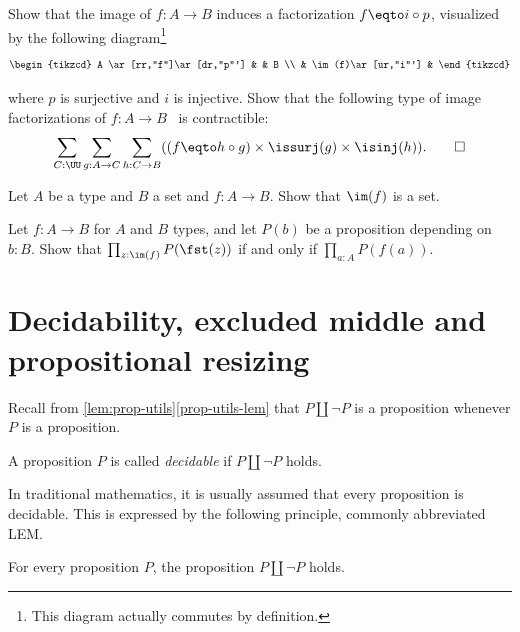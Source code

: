 \begin{xca}\label{xca:unique-fact-image}
  Show that the image of $f : A \to B$ induces a factorization
  $f \eqto i\circ p$, visualized by the following diagram\footnote{%
  This diagram actually commutes by definition.}
  \[
    \begin{tikzcd}
      A \ar[rr,"f"]\ar[dr,"p"'] & & B \\
      & \im(f)\ar[ur,"i"'] &
    \end{tikzcd}
  \]

  where $p$ is surjective and $i$ is injective. Show that the
  following type of image factorizations of $f : A \to B$~
  is contractible:
  \[
  \sum_{C:\UU}\sum_{g:A\to C}\sum_{h: C\to B}
  ((f \eqto h\circ g) \times \issurj(g) \times \isinj(h)).\qedhere
  \]
\end{xca}

\begin{xca}\label{xca:prop-image-is-set}
Let $A$ be a type and $B$ a set and $f:A\to B$.
Show that $\im(f)$ is a set.
\end{xca}

\begin{xca}\label{xca:all-prop-image}
Let $f:A\to B$ for $A$ and $B$ types, and let $P(b)$ be a proposition
depending on $b:B$.
Show that $\prod_{z:\im(f)} P(\fst(z))$ if and only if $\prod_{a:A} P(f(a))$.
\end{xca}



\section{Decidability, excluded middle and propositional resizing}
\label{sec:decidability}

Recall from \cref{lem:prop-utils}\ref{prop-utils-lem} that $P\amalg \neg P$ is a proposition whenever $P$ is a proposition.
\begin{definition}\label{def:decidability}
  A proposition $P$ is called \emph{decidable}
  if $P\amalg\neg P$ holds.
\end{definition}
In traditional mathematics, it is usually assumed that
every proposition is decidable.
This is expressed by the following principle, commonly abbreviated LEM.
\begin{principle}
  \label{pri:lem}%
  For every proposition $P$, the proposition $P \amalg \neg P$ holds.
\end{principle}

